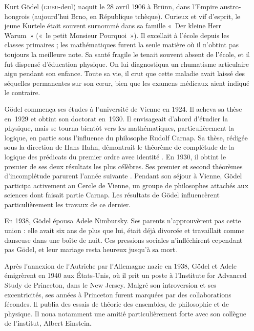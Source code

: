 \documentclass[../../../include/open-logic-section]{subfiles}
\begin{document}



Kurt G{\"o}del
(\textsc{gueu}-deul)
naquit le
28 avril 1906
à Br{\"u}nn,
dans l'Empire
austro-hongrois
(aujourd'hui
Brno, en
République tchèque).
Curieux et
vif d'esprit,
le jeune Kurtele
était souvent
surnommé dans
sa famille
«~Der kleine
Herr Warum~»
(«~le petit
Monsieur Pourquoi~»).
Il excellait
à l'école
depuis les
classes primaires ;
les mathématiques
furent la seule
matière où il
n'obtint pas
toujours la
meilleure note.
Sa santé fragile
le tenait souvent
absent de l'école,
et il fut dispensé
d'éducation physique.
On lui diagnostiqua
un rhumatisme
articulaire aigu
pendant son enfance.
Toute sa vie,
il crut que
cette maladie
avait laissé
des séquelles
permanentes
sur son cœur,
bien que les
examens médicaux
aient indiqué
le contraire.

G{\"o}del commença
ses études à
l'université
de Vienne
en 1924. Il acheva sa
thèse en~1929 et obtint
son doctorat en~1930.
Il envisageait
d'abord d'étudier
la physique,
mais se tourna
bientôt vers
les mathématiques,
particulièrement
la logique,
en partie sous
l'influence
du philosophe
Rudolf Carnap.
Sa thèse, rédigée
sous la direction
de Hans Hahn,
démontrait le
théorème de
complétude de
la logique
des prédicats
du premier ordre
avec identité
\citep{Godel1929}.
En 1930, il obtint le premier de ses deux résultats
les plus célèbres. Ses premier et second théorèmes
d'incomplétude parurent l'année suivante
\citep{Godel1931}.
Pendant son
séjour à Vienne,
G{\"o}del participa
activement au
Cercle de Vienne,
un groupe de
philosophes
attachés aux
sciences dont
faisait partie
Carnap. Les
résultats de
G{\"o}del influencèrent
particulièrement
les travaux
de ce dernier.

En 1938,
G\"odel épousa
Adele Nimbursky.
Ses parents
n'approuvèrent pas
cette union :
elle avait
six ans de
plus que lui,
était déjà
divorcée et
travaillait
comme danseuse
dans une boîte
de nuit.
Ces pressions
sociales
n'infléchirent
cependant pas
G{\"o}del,
et leur mariage
resta heureux
jusqu'à sa mort.

Après l'annexion
de l'Autriche
par l'Allemagne
nazie en 1938,
G{\"o}del et Adele
émigrèrent en 1940
aux États-Unis,
où il prit
un poste à
l'Institute for
Advanced Study
de Princeton,
dans le
New Jersey.
Malgré son
introversion
et ses
excentricités,
ses années
à Princeton
furent marquées
par des collaborations
fécondes. Il
publia des
essais de
théorie des
ensembles,
de philosophie
et de physique.
Il noua notamment
une amitié
particulièrement
forte avec
son collègue
de l'institut,
Albert Einstein.
\end{document}
